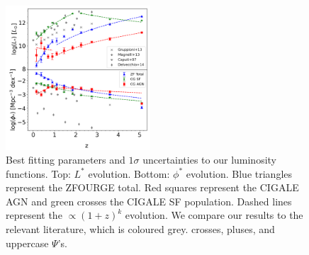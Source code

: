 \begin{figure}[h]
    \centering
    \includegraphics[width=0.48\textwidth]{Figures/Param Evo.png}
    \caption{Best fitting parameters and $1\sigma$ uncertainties to our luminosity functions. Top: $L^{*}$ evolution. Bottom: $\phi^{*}$ evolution. Blue triangles represent the ZFOURGE total. Red squares represent the CIGALE AGN and green crosses the CIGALE SF population. Dashed lines represent the $\propto(1+z)^k$ evolution. We compare our results to the relevant literature, which is coloured grey. \cite{gruppioni_herschel_2013} crosses, \cite{magnelli_deepest_2013} pluses, and \cite{caputi_infrared_2007} uppercase $\Psi$'s.}
    \label{Fig: Param Evo}
\end{figure}

